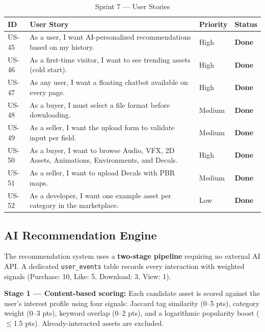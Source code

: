 \begin{table}[H]
\centering
\caption{Sprint 7 --- User Stories}
\begin{tabularx}{\textwidth}{C{1cm} X C{2cm} C{2.5cm}}
\toprule
\textbf{ID} & \textbf{User Story} & \textbf{Priority} & \textbf{Status} \\
\midrule
US-45 & As a user, I want AI-personalized recommendations based on my history. & High & \textcolor{igsGreen}{\textbf{Done}} \\
US-46 & As a first-time visitor, I want to see trending assets (cold start). & High & \textcolor{igsGreen}{\textbf{Done}} \\
US-47 & As any user, I want a floating chatbot available on every page. & High & \textcolor{igsGreen}{\textbf{Done}} \\
US-48 & As a buyer, I must select a file format before downloading. & Medium & \textcolor{igsGreen}{\textbf{Done}} \\
US-49 & As a seller, I want the upload form to validate input per field. & Medium & \textcolor{igsGreen}{\textbf{Done}} \\
US-50 & As a buyer, I want to browse Audio, VFX, 2D Assets, Animations, Environments, and Decals. & High & \textcolor{igsGreen}{\textbf{Done}} \\
US-51 & As a seller, I want to upload Decals with PBR maps. & Medium & \textcolor{igsGreen}{\textbf{Done}} \\
US-52 & As a developer, I want one example asset per category in the marketplace. & Low & \textcolor{igsGreen}{\textbf{Done}} \\
\bottomrule
\end{tabularx}
\end{table}

\subsection{AI Recommendation Engine}

The recommendation system uses a \textbf{two-stage pipeline} requiring no external AI API. A dedicated \texttt{user\_events} table records every interaction with weighted signals (Purchase: 10, Like: 5, Download: 3, View: 1).

\textbf{Stage 1 — Content-based scoring:} Each candidate asset is scored against the user's interest profile using four signals: Jaccard tag similarity (0--5 pts), category weight (0--3 pts), keyword overlap (0--2 pts), and a logarithmic popularity boost ($\leq$1.5 pts). Already-interacted assets are excluded.

